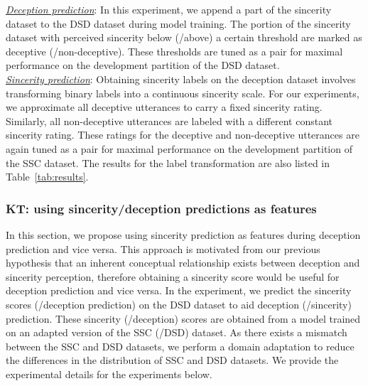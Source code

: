 \documentclass{article}
\begin{document}
\noindent\underline{\it Deception prediction}: 
In this experiment, we append a part of the sincerity dataset to the DSD dataset during model training.
The portion of the sincerity dataset with perceived sincerity below (/above) a certain threshold are marked as deceptive (/non-deceptive). 
These thresholds are tuned as a pair for maximal performance on the development partition of the DSD dataset. 
\\

\noindent\underline{\it Sincerity prediction}:
Obtaining sincerity labels on the deception dataset involves transforming binary labels into a continuous sincerity scale.
For our experiments, we approximate all deceptive utterances to carry a fixed sincerity rating. 
Similarly, all non-deceptive utterances are labeled with a different constant sincerity rating.
These ratings for the deceptive and non-deceptive utterances are again tuned as a pair for maximal performance on the development partition of the SSC dataset.
The results for the label transformation are also listed in Table~\ref{tab:results}.

\subsubsection{KT: using sincerity/deception predictions as features}
\label{sec:gfkonly}
In this section, we propose using sincerity prediction as features during deception prediction and vice versa.
This approach is motivated from our previous hypothesis that an inherent conceptual relationship exists between deception and sincerity perception, therefore obtaining a sincerity score would be useful for deception prediction and vice versa.
In the experiment, we predict the sincerity scores (/deception prediction) on the DSD dataset to aid deception (/sincerity) prediction. 
These sincerity (/deception) scores are obtained from a model trained on an adapted version of the SSC (/DSD) dataset.
As there exists a mismatch between the SSC and DSD datasets, we perform a domain adaptation to reduce the differences in the distribution of SSC and DSD datasets.
We provide the experimental details for the experiments below.
\\
\end{document}
